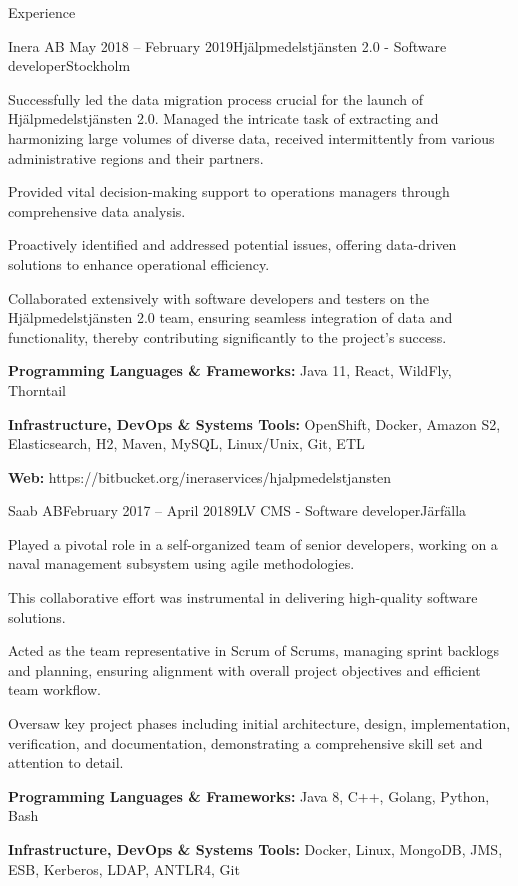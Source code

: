 \documentclass{resume}
\begin{document}
\begin{rSection}{Experience}
    \begin{rSubsection}{Inera AB }{May 2018 -- February 2019}{Hjälpmedelstjänsten 2.0 - Software developer}{Stockholm}
      \item Successfully led the data migration process crucial for the launch of Hjälpmedelstjänsten 2.0. Managed the intricate task of extracting and harmonizing large volumes of diverse data, received intermittently from various administrative regions and their partners.
      \item Provided vital decision-making support to operations managers through comprehensive data analysis.
      \item Proactively identified and addressed potential issues, offering data-driven solutions to enhance operational efficiency.
      \item Collaborated extensively with software developers and testers on the Hjälpmedelstjänsten 2.0 team, ensuring seamless integration of data and functionality, thereby contributing significantly to the project's success.
      \item \textbf{Programming Languages \& Frameworks:} Java 11, React, WildFly, Thorntail
      \item \textbf{Infrastructure, DevOps \& Systems Tools:} OpenShift, Docker, Amazon S2, Elasticsearch, H2, Maven, MySQL, Linux/Unix, Git, ETL
      \item \textbf{Web:} https://bitbucket.org/ineraservices/hjalpmedelstjansten
    \end{rSubsection}

    \begin{rSubsection}{Saab AB}{February 2017 -- April 2018}{9LV CMS - Software developer}{Järfälla}
      \item Played a pivotal role in a self-organized team of senior developers, working on a naval management subsystem using agile methodologies.
      \item This collaborative effort was instrumental in delivering high-quality software solutions.
      \item Acted as the team representative in Scrum of Scrums, managing sprint backlogs and planning, ensuring alignment with overall project objectives and efficient team workflow.
      \item Oversaw key project phases including initial architecture, design, implementation, verification, and documentation, demonstrating a comprehensive skill set and attention to detail.
      \item \textbf{Programming Languages \& Frameworks:} Java 8, C++, Golang, Python, Bash
      \item \textbf{Infrastructure, DevOps \& Systems Tools:} Docker, Linux, MongoDB, JMS, ESB, Kerberos, LDAP, ANTLR4, Git
    \end{rSubsection}


\end{rSection}
\end{document}
